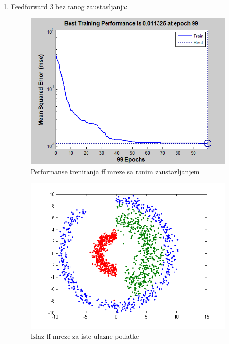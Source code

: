 \documentclass{report}
\begin{document}
\begin{enumerate}
\begin{enumerate}
\newpage
\item\LARGE
Feedforward 3 bez ranog zaustavljanja:\large

\begin{figure}[!h]
\begin{center}
\includegraphics[scale=0.8]{B1performanceFF3.png}
\caption{Performanse treniranja ff mreze sa ranim zaustavljanjem}
\end{center}
\end{figure}

\begin{figure}[!h]
\begin{center}
\includegraphics[scale=0.8]{B1outputFF3Same.png}
\caption{Izlaz ff mreze za iste ulazne podatke}
\end{center}
\end{figure}


\end{enumerate}
\end{enumerate}
\end{document}
